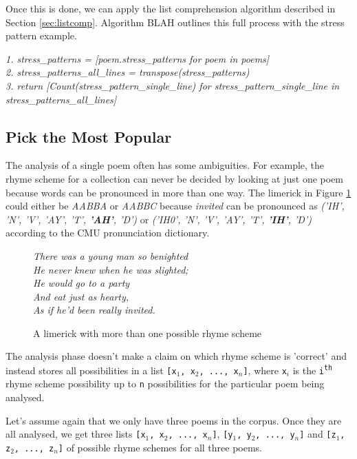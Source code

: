 Once this is done, we can apply the list comprehension algorithm described in Section \ref{sec:listcomp}. Algorithm BLAH outlines this full process with the stress pattern example.

\textit{
1. stress\_patterns = [poem.stress\_patterns for poem in poems]\\
2. stress\_patterns\_all\_lines = transpose(stress\_patterns)\\
3. return [Count(stress\_pattern\_single\_line) for stress\_pattern\_single\_line in stress\_patterns\_all\_lines]\\
}

\subsection{Pick the Most Popular}

The analysis of a single poem often has some ambiguities. For example, the rhyme scheme for a collection can never be decided by looking at just one poem because words can be pronounced in more than one way. The limerick in Figure \ref{fig:ambiguous-rhyme} could either be \textit{AABBA} or \textit{AABBC} because \textit{invited} can be pronounced as \textit{('IH', 'N', 'V', 'AY', 'T', \textbf{'AH'}, 'D')} or \textit{('IH0', 'N', 'V', 'AY', 'T', \textbf{'IH'}, 'D')} according to the CMU pronunciation dictionary.

\begin{figure}[h!]
\centering
\textit{
There was a young man so benighted\\
He never knew when he was slighted;\\
He would go to a party\\
And eat just as hearty,\\
As if he'd been really invited.\\
}
\caption{A limerick with more than one possible rhyme scheme}
\label{fig:ambiguous-rhyme}
\end{figure}

The analysis phase doesn't make a claim on which rhyme scheme is 'correct' and instead stores all possibilities in a list \texttt{[x$_1$, x$_2$, ..., x$_n$]}, where \texttt{x$_i$} is the \texttt{i\textsuperscript{th}} rhyme scheme possibility up to \texttt{n} possibilities for the particular poem being analysed.

Let's assume again that we only have three poems in the corpus. Once they are all analysed, we get three lists \texttt{[x$_1$, x$_2$, ..., x$_n$]}, \texttt{[y$_1$, y$_2$, ..., y$_n$]} and \texttt{[z$_1$, z$_2$, ..., z$_n$]} of possible rhyme schemes for all three poems.

